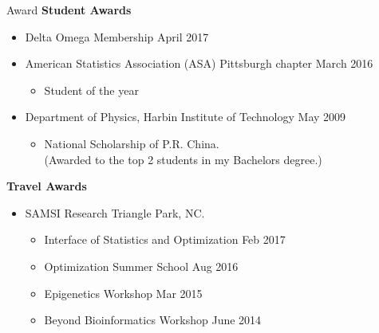 \documentclass{resume} %
\begin{document}
\begin{rSection}{Award}
\textbf{Student Awards}
\begin{itemize}[noitemsep,topsep=0pt]
\item  Delta Omega Membership \hfill April 2017
\item American Statistics Association (ASA) Pittsburgh chapter  \hfill March 2016
\begin{itemize}[noitemsep,topsep=0pt]
\item Student of the year
\end{itemize}
\item Department of Physics, Harbin Institute of Technology \hfill May 2009
\begin{itemize}[noitemsep,topsep=0pt]
\item National Scholarship of P.R. China. \\(Awarded to the top 2 students in my Bachelors degree.)
\end{itemize}
\end{itemize}


\textbf{Travel Awards} 
\begin{itemize}[noitemsep,topsep=0pt]
\item SAMSI Research Triangle Park, NC.	
\begin{itemize}[noitemsep,topsep=0pt]
\item {Interface of Statistics and Optimization} \hfill Feb 2017
\item {Optimization Summer School} \hfill Aug 2016
\item {Epigenetics Workshop} \hfill Mar 2015
\item {Beyond Bioinformatics Workshop} \hfill June 2014
\end{itemize}

\end{itemize}

\end{rSection}

\end{document}
